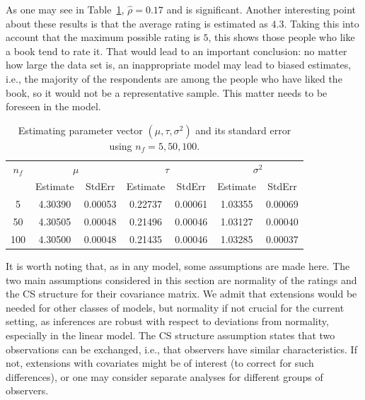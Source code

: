 \documentclass[11pt,a5paper,twoside]{book}
\begin{document}
As one may see in Table~\ref{tab_amazon_est}, $\widehat{\rho}=0.17$ and is significant. Another interesting point about these results is that the average rating is estimated as $4.3$. Taking this into account that the maximum possible rating is $5$, this shows those people who like a book tend to rate it. That would lead to an important conclusion: no matter how large the data set is, an inappropriate model may lead to biased estimates, i.e., the majority of the respondents are among the people who have liked the book, so it would not be a representative sample. This matter needs to be foreseen in the model.
\begin{table}[ht]
\centering
\caption{Estimating parameter vector $(\mu,\tau,\sigma^2)$ and its standard error using $n_f=5,50,100$.}
\label{tab_amazon_est}
\begin{tabular}{ccccccc}
  \hline\hline
 $n_f$& \multicolumn{2}{c}{$\mu$} & \multicolumn{2}{c}{$\tau$} & \multicolumn{2}{c}{$\sigma^2$}\\
 & Estimate & StdErr & Estimate & StdErr & Estimate & StdErr \\ 
  \hline
5 & 4.30390 & 0.00053 & 0.22737 & 0.00061 & 1.03355 & 0.00069 \\ 
  50 & 4.30505 & 0.00048 & 0.21496 & 0.00046 & 1.03127 & 0.00040 \\ 
  100 & 4.30500 & 0.00048 & 0.21435 & 0.00046 & 1.03285 & 0.00037 \\ 
   \hline\hline
\end{tabular}
\end{table}

It is worth noting that, as in any model, some assumptions are made here. The two main assumptions considered in this section are normality of the ratings and the CS structure for their covariance matrix. We admit that extensions would be needed for other classes of models, but normality if not crucial for the current setting, as inferences are robust with respect to deviations from normality, especially in the linear model. The CS structure assumption states that two observations can be exchanged, i.e., that observers have similar characteristics. If not, extensions with covariates might be of interest (to correct for such differences), or one may consider separate analyses for different groups of observers. 
\end{document}
